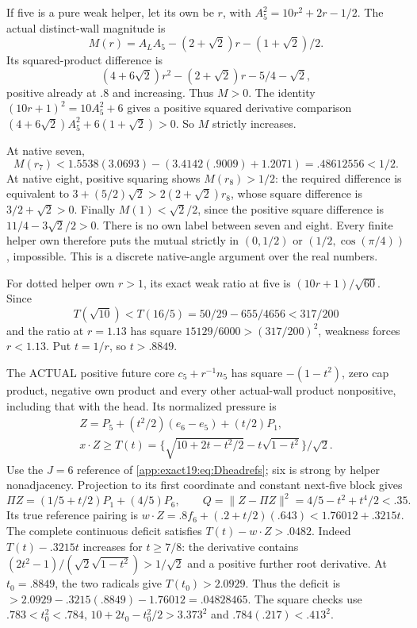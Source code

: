 \documentclass[11pt]{article}
\theoremstyle{definition}
\theoremstyle{remark}
\begin{document}
If five is a pure weak helper,
let its own be \(r\), with
\(A_5^2=10r^2+2r-1/2\).
The actual distinct-wall magnitude is
\[
             M(r)=A_LA_5-(2+\sqrt2)r-(1+\sqrt2)/2 .
\]
Its squared-product difference is
\[
 (4+6\sqrt2)r^2-(2+\sqrt2)r-5/4-\sqrt2 ,
\]
positive already at \(.8\) and
increasing.
Thus \(M>0\).
The identity
\((10r+1)^2=10A_5^2+6\)
gives a positive squared derivative
comparison
\((4+6\sqrt2)A_5^2+6(1+\sqrt2)>0\).
So \(M\) strictly increases.

At native seven,
\[
 M(r_7)<1.5538(3.0693)
             -(3.4142(.9009)+1.2071)=.48612556<1/2 .
\]
At native eight, positive squaring
shows \(M(r_8)>1/2\):
the required difference is equivalent
to
\(3+(5/2)\sqrt2>2(2+\sqrt2)r_8\),
whose square difference is
\(3/2+\sqrt2>0\).
Finally \(M(1)<\sqrt2/2\), since
the positive square difference is
\(11/4-3\sqrt2/2>0\).
There is no own label between
seven and eight.
Every finite helper own therefore
puts the mutual strictly in
\((0,1/2)\) or
\((1/2,\cos(\pi/4))\), impossible.
This is a discrete native-angle
argument over the real numbers.

For dotted helper own \(r>1\),
its exact weak ratio at five is
\((10r+1)/\sqrt{60}\).
Since
\[
 T(\sqrt{10})<T(16/5)=50/29-655/4656<317/200
\]
and the ratio at \(r=1.13\)
has square \(15129/6000>(317/200)^2\),
weakness forces \(r<1.13\).
Put \(t=1/r\), so \(t>.8849\).

The ACTUAL positive future core
\(c_5+r^{-1}n_5\) has square
\(-(1-t^2)\), zero cap product,
negative own product and every
other actual-wall product nonpositive,
including that with the head.
Its normalized pressure is
\[
 \begin{gathered}
 Z=P_5+(t^2/2)(e_6-e_5)+(t/2)P_1,\\
 x\cdot Z\ge
 T(t)=\{\sqrt{10+2t-t^2/2}-t\sqrt{1-t^2}\}/\sqrt2 .
 \end{gathered}
\]
Use the \(J=6\) reference of
\eqref{app:exact19:eq:Dheadrefs};
six is strong by helper
nonadjacency.
Projection to its first coordinate
and constant next-five block gives
\[
 \Pi Z=(1/5+t/2)P_1+(4/5)P_6,\qquad
 Q=\|Z-\Pi Z\|^2=4/5-t^2+t^4/2<.35 .
\]
Its true reference pairing is
\(w\cdot Z=.8f_6+(.2+t/2)(.643)
<1.76012+.3215t\).
The complete continuous deficit
satisfies \(T(t)-w\cdot Z>.0482\).
Indeed \(T(t)-.3215t\) increases
for \(t\ge7/8\): the derivative
contains
\((2t^2-1)/(\sqrt2\sqrt{1-t^2})>1/\sqrt2\)
and a positive further root
derivative.
At \(t_0=.8849\), the two radicals
give \(T(t_0)>2.0929\).
Thus the deficit is
\(>2.0929-.3215(.8849)-1.76012
=.04828465\).
The square checks use
\(.783<t_0^2<.784\),
\(10+2t_0-t_0^2/2>3.373^2\)
and \(.784(.217)<.413^2\).
\end{document}
